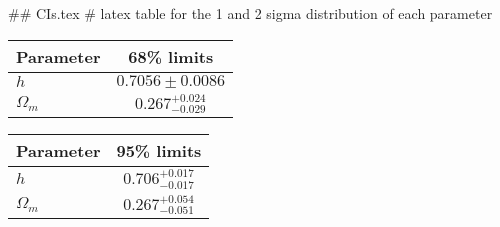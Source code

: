 ## CIs.tex
# latex table for the 1 and 2 sigma distribution of each parameter

\begin{tabular} { l  c}
 Parameter &  68\% limits\\
\hline
{\boldmath$h              $} & $0.7056\pm 0.0086          $\\
{\boldmath$\Omega_m       $} & $0.267^{+0.024}_{-0.029}   $\\
\hline
\end{tabular}

\begin{tabular} { l  c}
 Parameter &  95\% limits\\
\hline
{\boldmath$h              $} & $0.706^{+0.017}_{-0.017}   $\\
{\boldmath$\Omega_m       $} & $0.267^{+0.054}_{-0.051}   $\\
\hline
\end{tabular}
